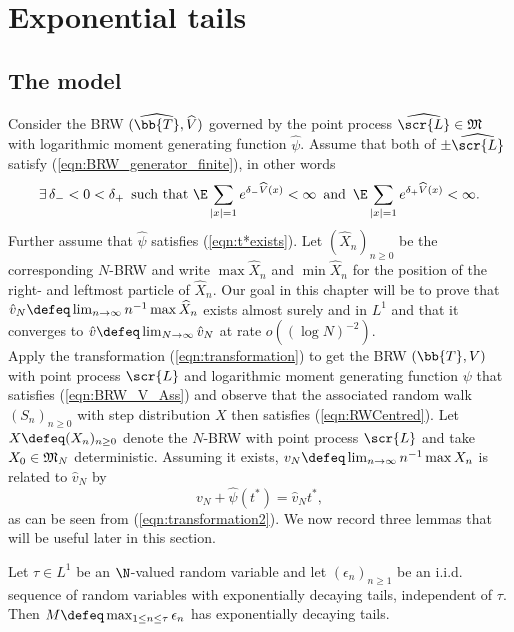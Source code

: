 \section{Exponential tails}

\subsection{The model}\label{subsec:The_model}
Consider the BRW $(\widehat{\bb{T}}, \widehat{V})$ governed by the point process $\widehat{\scr{L}} \in \frak{M}$ with logarithmic moment generating function $\widehat{\psi}$. Assume that both of $\pm \widehat{\scr{L}}$ satisfy (\ref{eqn:BRW_generator_finite}), in other words 
\begin{equation}\label{ass:DacyingTails}
\exists\, \delta_- < 0 < \delta_+\, \text{ such that } \E \sum\limits_{|x| = 1} e^{\delta_- \widehat{V}(x)} < \infty\, \text{ and }\, \E \sum\limits_{|x| = 1} e^{\delta_+ \widehat{V}(x)} < \infty. 
\end{equation}
Further assume that $\widehat{\psi}$ satisfies (\ref{eqn:t*exists}). Let $(\widehat{X}_n)_{n \geq 0}$ be the corresponding $N$-BRW and write $\max \widehat{X}_n$ and $\min \widehat{X}_n$ for the position of the right- and leftmost particle of $\widehat{X}_n$. Our goal in this chapter will be to prove that $\hat{v}_N \defeq \lim_{n \to \infty} n^{-1}\max\widehat{X}_n$ exists almost surely and in $L^1$ and that it converges to $\hat{v} \defeq \lim_{N \to \infty} \hat{v}_N$ at rate $o((\log N)^{-2})$. \\

Apply the transformation (\ref{eqn:transformation}) to get the BRW $(\bb{T}, V)$ with point process $\scr{L}$ and logarithmic moment generating function $\psi$ that satisfies (\ref{eqn:BRW_V_Ass}) and observe that the associated random walk $(S_n)_{n \geq 0}$ with step distribution $X$ then satisfies (\ref{eqn:RWCentred}). Let $X \defeq (X_n)_{n \geq 0}$ denote the $N$-BRW with point process $\scr{L}$ and take $X_0 \in \frak{M}_N$ deterministic. Assuming it exists, $v_N \defeq \lim_{n \to \infty} n^{-1} \max X_n$ is related to $\hat{v}_N$ by 
\begin{equation}\label{eqn:speed_relation}
v_N + \widehat{\psi}(t^*)= \hat{v}_N t^*, 
\end{equation}
as can be seen from (\ref{eqn:transformation2}). We now record three lemmas that will be useful later in this section. 

\begin{lemma}\label{lem:ExpTailsMax}
Let $\tau \in L^1$ be an $\N$-valued random variable and let $(\epsilon_n)_{n \geq 1}$ be an i.i.d. sequence of random variables with exponentially decaying tails, independent of $\tau$. Then $M \defeq \max_{1 \leq n \leq \tau} \epsilon_n$ has exponentially decaying tails. 
\end{lemma}

